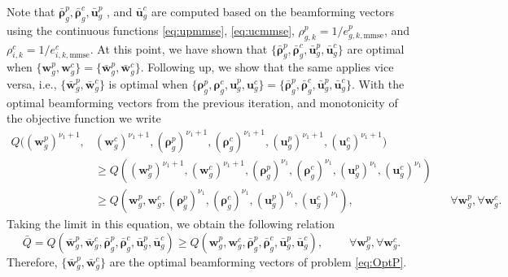 \documentclass[12pt,draftcls,onecolumn]{IEEEtran}
\theoremstyle{remark}
\theoremstyle{definition}
\begin{document}
{\begin{equation}
\end{equation}
Note that $\bar{\bm \rho}_g^p, \bar{\bm \rho}_g^c , \bar{\mathbf{u}}_g^p$ , and $\bar{\mathbf{u}}_g^c$ are computed based on the beamforming vectors using the continuous functions \eqref{eq:upmmse}, \eqref{eq:ucmmse}, $\rho_{g,k}^p = 1/e_{g,k,\text{mmse}}^p$, and $\rho_{i,k}^c = 1/e_{i,k,\text{mmse}}^c$. At this point, we have shown that $\{ \bar{\bm \rho}_g^p, \bar{\bm \rho}_g^c , \bar{\mathbf{u}}_g^p, \bar{\mathbf{u}}_g^c \}$ are optimal when $\{\mathbf{w}_{g}^p, \mathbf{w}_{g}^c\} = \{\bar{\mathbf{w}}_{g}^p, \bar{\mathbf{w}}_{g}^c\}$. Following up, we show that the same applies vice versa, i.e., $\{\bar{\mathbf{w}}_{g}^p, \bar{\mathbf{w}}_{g}^c\}$ is optimal when $\{ {\bm \rho}_g^p,{\bm \rho}_g^c,\mathbf{u}_g^p,\mathbf{u}_g^c \} = \{ \bar{\bm \rho}_g^p, \bar{\bm \rho}_g^c , \bar{\mathbf{u}}_g^p , \bar{\mathbf{u}}_g^c \}$. With the optimal beamforming vectors from the previous iteration, and monotonicity of the objective function we write
\begin{align}
	Q((\mathbf{w}_{g}^p)^{\nu_1+1},& (\mathbf{w}_{g}^c)^{\nu_1+1}, ({\bm \rho}_g^p)^{\nu_1+1},({\bm \rho}_g^c)^{\nu_1+1},(\mathbf{u}_g^p)^{\nu_1+1},(\mathbf{u}_g^c)^{\nu_1+1}) \nonumber \\
	&\geq Q((\mathbf{w}_{g}^p)^{\nu_1+1}, (\mathbf{w}_{g}^c)^{\nu_1+1}, ({\bm \rho}_g^p)^{\nu_1},({\bm \rho}_g^c)^{\nu_1},(\mathbf{u}_g^p)^{\nu_1},(\mathbf{u}_g^c)^{\nu_1}) \nonumber \\
	&\geq Q(\mathbf{w}_{g}^p, \mathbf{w}_{g}^c, ({\bm \rho}_g^p)^{\nu_1},({\bm \rho}_g^c)^{\nu_1},(\mathbf{u}_g^p)^{\nu_1},(\mathbf{u}_g^c)^{\nu_1}), && \forall \mathbf{w}_{g}^p, \forall \mathbf{w}_{g}^c.
\end{align}
Taking the limit in this equation, we obtain the following relation
\begin{equation}
	\bar{Q} = Q( \bar{\mathbf{w}}_{g}^p, \bar{\mathbf{w}}_{g}^c, \bar{\bm \rho}_g^p, \bar{\bm \rho}_g^c , \bar{\mathbf{u}}_g^p , \bar{\mathbf{u}}_g^c ) \geq Q( \mathbf{w}_{g}^p, \mathbf{w}_{g}^c, \bar{\bm \rho}_g^p, \bar{\bm \rho}_g^c , \bar{\mathbf{u}}_g^p , \bar{\mathbf{u}}_g^c ), \qquad\; \forall \mathbf{w}_{g}^p, \forall \mathbf{w}_{g}^c.
\end{equation}
Therefore, $\{\bar{\mathbf{w}}_{g}^p, \bar{\mathbf{w}}_{g}^c\}$ are the optimal beamforming vectors of problem \eqref{eq:OptP}.
}
\end{document}
